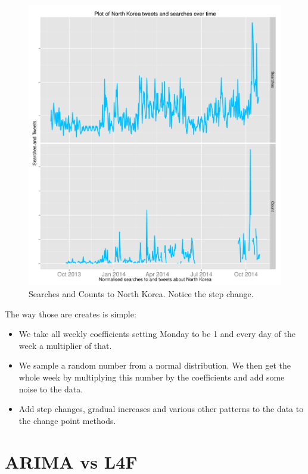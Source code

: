 \documentclass[minf,twoside,singlespacing,parskip,notimes,deptreport]{infthesis} %
\begin{document}
\begin{figure}[p!]
\begin{center}
\includegraphics[width=\textwidth]{North_Korea}
\end{center}
\caption{Searches and Counts to North Korea. Notice the step change. }
\label{NorthKoreaPlot}
\end{figure}

The way those are creates is simple:
\begin{itemize}
\item We take all weekly coefficients setting Monday to be 1 and every day of the week a multiplier of that. 
\item We sample a random number from a normal distribution. We then get the whole week by multiplying this number by the coefficients and add some noise to the data. 
\item Add step changes, gradual increases and various other patterns to the data to the change point methods.
\end{itemize}

\section{ARIMA vs L4F}
\end{document}
